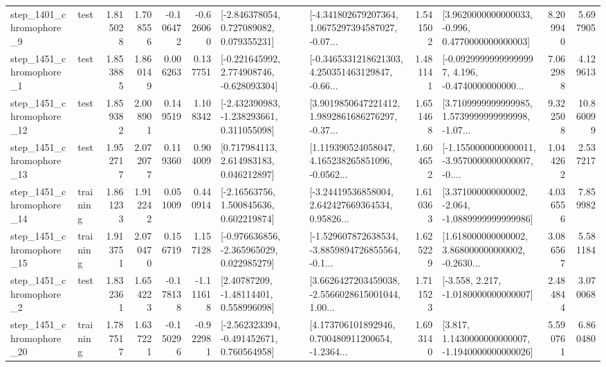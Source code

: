 \begin{tabular}{llrrrrllrlrr}
  step\_1401\_chromophore\_9 &      test &      1.815028 &    1.708556 &     -0.106472 & -0.626060 &    [-2.846378054, 0.727089082, 0.079355231] &  [-4.341802679207364, 1.0675297394587027, -0.07... &       1.541502 &   [3.9620000000000033, -0.996, 0.4770000000000003] &            8.209940 &          5.697905 \\
  step\_1451\_chromophore\_1 &      test &      1.853885 &    1.860149 &      0.006263 &  0.137751 &   [-0.221645992, 2.774908746, -0.628093304] &  [-0.3465331218621303, 4.250351463129847, -0.66... &       1.481141 &  [-0.09299999999999997, 4.196, -0.4740000000000... &            7.062988 &          4.129613 \\
 step\_1451\_chromophore\_12 &      test &      1.859382 &    2.008901 &      0.149519 &  1.108342 &   [-2.432390983, -1.238293661, 0.311055098] &  [3.9019850647221412, 1.9892861686276297, -0.37... &       1.651468 &  [3.7109999999999985, 1.5739999999999998, -1.07... &            9.322508 &         10.860099 \\
 step\_1451\_chromophore\_13 &      test &      1.952717 &    2.072077 &      0.119360 &  0.904009 &     [0.717984113, 2.614983183, 0.046212897] &  [1.119390524058047, 4.165238265851096, -0.0562... &       1.604652 &  [-1.1550000000000011, -3.9570000000000007, -0.... &            1.044262 &          2.537217 \\
 step\_1451\_chromophore\_14 &  training &      1.861233 &    1.912242 &      0.051009 &  0.440914 &     [-2.16563756, 1.500845636, 0.602219874] &  [-3.24419536858004, 2.642427669364534, 0.95826... &       1.610363 &   [3.371000000000002, -2.064, -1.0889999999999986] &            4.036556 &          7.859982 \\
 step\_1451\_chromophore\_15 &  training &      1.913751 &    2.070470 &      0.156719 &  1.157128 &   [-0.976636856, -2.365965029, 0.022985279] &  [-1.529607872638534, -3.8859894726855564, -0.1... &       1.625229 &  [1.618000000000002, 3.868000000000002, -0.2630... &            3.086567 &          5.581184 \\
  step\_1451\_chromophore\_2 &      test &      1.832361 &    1.654223 &     -0.178138 & -1.111618 &      [2.40787209, -1.48114401, 0.558996098] &  [3.6626427203459038, -2.5566028615001044, 1.00... &       1.711523 &               [-3.558, 2.217, -1.0180000000000007] &            2.484844 &          3.070068 \\
 step\_1451\_chromophore\_20 &  training &      1.787517 &    1.637221 &     -0.150296 & -0.922981 &   [-2.562323394, -0.491452671, 0.760564958] &  [4.173706101892946, 0.700480911200654, -1.2364... &       1.693140 &   [3.817, 1.1430000000000007, -1.1940000000000026] &            5.590761 &          6.860480 \\

\end{tabular}
